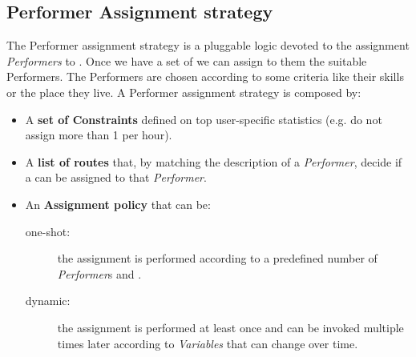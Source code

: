 \subsection{Performer Assignment strategy}
The Performer assignment strategy is a pluggable logic devoted to the assignment
\emph{Performers} to \utask{}. Once we have a set of \utask{} we can assign to
them the suitable Performers. The Performers are chosen according to some
criteria like their skills or the place they live. A Performer assignment
strategy is composed by:
\begin{itemize}
    \item A \textbf{set of Constraints} defined on top user-specific statistics
	(e.g. do not assign more than 1 \utask{} per hour).

    \item A \textbf{list of routes} that, by matching the description of a
    \emph{Performer}, decide if a \utask{} can be assigned to that \emph{Performer}.

    \item An \textbf{Assignment policy} that can be:
        \begin{description}
            \item[one-shot:] the assignment is performed according to a predefined
            number of \emph{Performer}s and \utask{}.
            \item[dynamic:] the assignment is performed at least once and can be
            invoked multiple times later according to \emph{Variables} that can
            change over time.
        \end{description}
\end{itemize}



